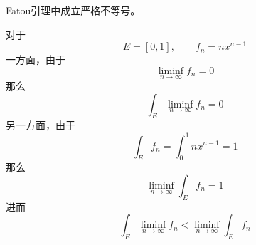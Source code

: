 \documentclass[lang = cn, scheme = chinese, thmcnt = section]{elegantbook}
\begin{document}
\begin{example}
	Fatou引理中成立严格不等号。
\end{example}

\begin{solution}
	对于%
	$$
	E=[0,1],\qquad f_n=nx^{n-1}
	$$
	一方面，由于
	$$
	\liminf_{n\to\infty}f_n=0
	$$
	那么%
	$$
	\int_E\liminf_{n\to\infty}f_n=0
	$$
	另一方面，由于%
	$$
	\int_E f_n=\int_{0}^{1}nx^{n-1}=1
	$$
	那么%
	$$
	\liminf_{n\to\infty}\int_E f_n=1
	$$
	进而
	$$
	\int_E\liminf_{n\to\infty}f_n<\liminf_{n\to\infty}\int_E f_n
	$$
\end{solution}
\end{document}
